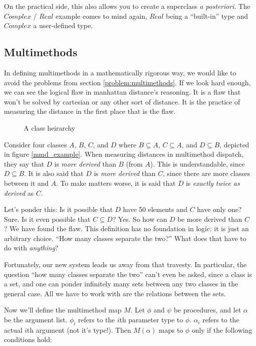 \documentclass[12pt]{article}
\begin{document}
On the practical side, this also allows you to create a superclass
\textit{a posteriori}.  The $\mathit{Complex}$ / $\mathit{Real}$ example
comes to mind again, $\mathit{Real}$ being a ``built-in'' type and
$\mathit{Complex}$ a user-defined type.

\subsection{Multimethods}

In defining multimethods in a mathematically rigorous way, we would like
to avoid the problems from section \ref{problem:multimethods}.  If we
look hard enough, we can see the logical flaw in manhattan distance's
reasoning.  It is a flaw that won't be solved by cartesian or any other
sort of distance.  It is the practice of measuring the distance in the
first place that is the flaw.

\begin{figure}
\caption{A class heirarchy}
\label{mmd_example}
\end{figure}

Consider four classes $A$, $B$, $C$, and $D$ where $B \subseteq A$, $C
\subseteq A$, and $D \subseteq B$, depicted in figure \vref{mmd_example}.
When measuring distances in multimethod dispatch, they say that $D$ is
\textit{more derived} than $B$ (from $A$).  This is understandable,
since $D \subseteq B$.  It is also said that $D$ is \textit{more
derived} than $C$, since there are more classes between it and $A$.  To
make matters worse, it is said that $D$ is \textit{exactly twice as
derived} as $C$.

Let's ponder this:  Is it possible that $D$ have 50 elements and $C$
have only one?  Sure.  Is it even possible that $C \subseteq D$?  Yes.
So how can $D$ be more derived than $C$?  We have found the flaw.  This
definition has no foundation in logic: it is just an arbitrary choice.
``How many classes separate the two?''  What does that have to do with
\textit{anything}?

Fortunately, our new system leads us away from that travesty.  In
particular, the question ``how many classes separate the two'' can't
even be asked, since a class is a set, and one can ponder infinitely
many sets between any two classes in the general case.  All we have to
work with are the relations between the sets.

Now we'll define the multimethod map $M$.  Let $\phi$ and $\psi$ be
procedures, and let $\alpha$ be the argument list.  $\phi_i$ refers to
the $i$th parameter type to $\phi$.  $\alpha_i$ refers to the actual
$i$th argument (not it's type!).  Then $M(\alpha)$ maps to $\phi$ only
if the following conditions hold:
\end{document}
